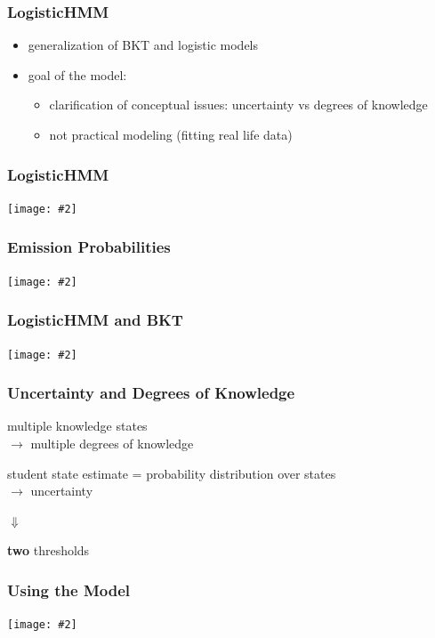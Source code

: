 \documentclass[bigger]{beamer}
\newcommand{\img}[2]{
  \begin{center}
    \texttt{[image: \#2]}
  \end{center}
}
\begin{document}
\begin{frame}
  \frametitle{LogisticHMM}

  \begin{itemize}
  \item generalization of BKT and logistic models
  \item goal of the model:
    \begin{itemize}
    \item clarification of conceptual issues: uncertainty vs degrees of
      knowledge
    \item not practical modeling (fitting real life data)
    \end{itemize}
  \end{itemize}
\end{frame}

\begin{frame}
  \frametitle{LogisticHMM}

  \img{.8}{logistichmm-intuition}
\end{frame}

\begin{frame}
  \frametitle{Emission Probabilities}

  \img{.7}{hmm-model-examples1}
\end{frame}

\begin{frame}
  \frametitle{LogisticHMM and BKT}

  \img{.7}{hmm-model-examples2}
\end{frame}

\begin{frame}
  \frametitle{Uncertainty and Degrees of Knowledge}

  multiple knowledge states\\
  $\rightarrow$ multiple degrees of knowledge

  \bigskip
  \bigskip
  student state estimate = probability distribution over states\\
  $\rightarrow$ uncertainty


  \begin{center}
    $\Downarrow$

    \bigskip
    \bigskip
    \textbf{two} thresholds
  \end{center}
  
\end{frame}

\begin{frame}
  \frametitle{Using the Model}

  \img{}{hmm-model-demo1}
\end{frame}
\end{document}
